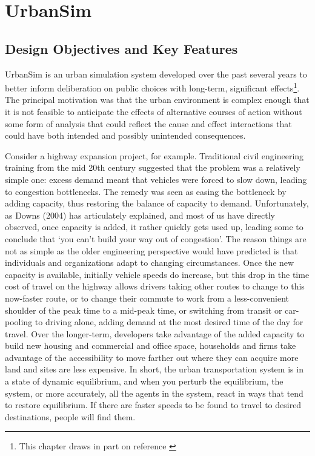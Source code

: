 \chapter{UrbanSim}

\section{Design Objectives and Key Features}

UrbanSim is an urban simulation system developed over the past
several years to better inform deliberation on public choices with
long-term, significant effects\footnote{This chapter draws in part
on reference \cite{waddell-brail-book-2001}}.  The principal motivation 
was that the urban environment
is complex enough that it is not feasible to anticipate the effects
of alternative courses of action without some form of analysis that
could reflect the cause and effect interactions that could have both
intended and possibly unintended consequences.

Consider a highway expansion project, for example.  Traditional civil engineering training from the mid 20th century suggested that the problem was a relatively simple one: excess demand meant that vehicles were forced to slow down, leading to congestion bottlenecks.  The remedy was seen as easing the bottleneck by adding capacity, thus restoring the balance of capacity to demand.  Unfortunately, as Downs (2004) has articulately explained, and most of us have directly observed, once capacity is added, it rather quickly gets used up, leading some to conclude that `you can't build your way out of congestion'. The reason things are not as simple as the older engineering perspective would have predicted is that individuals and organizations adapt to changing circumstances.  Once the new capacity is available, initially vehicle speeds do increase, but this drop in the time cost of travel on the highway allows drivers taking other routes to change to this now-faster route, or to change their commute to work from a less-convenient shoulder of the peak time to a mid-peak time, or switching from transit or car-pooling to driving alone, adding demand at the most desired time of the day for travel.  Over the longer-term, developers take advantage of the added capacity to build new housing and commercial and office space, households and firms take advantage of the accessibility to move farther out where they can acquire more land and sites are less expensive.  In short, the urban transportation system is in a state of dynamic equilibrium, and when you perturb the equilibrium, the system, or more accurately, all the agents in the system, react in ways that tend to restore equilibrium.  If there are faster speeds to be found to travel to desired destinations, people will find them.

